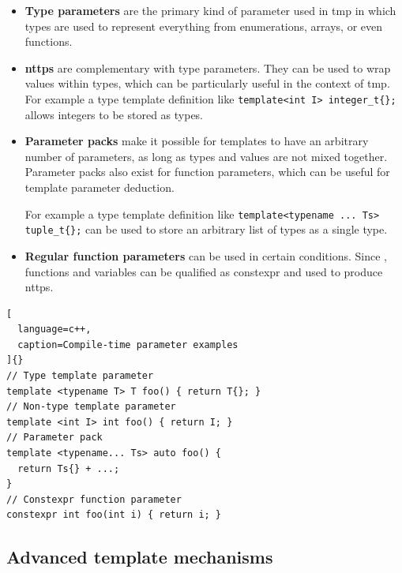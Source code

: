 \documentclass[../main]{subfiles}
\begin{document}
\begin{itemize}

  \item

\textbf{Type parameters} are the primary kind of parameter used in \gls{tmp}
in which types are used to represent everything from enumerations, arrays,
or even functions.

  \item

\textbf{\glspl{nttp}} are complementary with type parameters.
They can be used to wrap values within types, which can be particularly useful
in the context of \gls{tmp}. For example a type template definition like
\lstinline|template<int I> integer_t{};| allows integers to be stored as types.

  \item

\textbf{Parameter packs} make it possible for templates to have an
arbitrary number of parameters, as long as types and values
are not mixed together. Parameter packs also exist for function parameters,
which can be useful for template parameter deduction.

For example a type template definition like
\lstinline|template<typename ... Ts> tuple_t{};| can be used to store an
arbitrary list of types as a single type.

  \item

\textbf{Regular function parameters} can be used in certain conditions.
Since , functions and variables can be qualified as \gls{constexpr}
and used to produce \glspl{nttp}.

\end{itemize}

\begin{lstlisting}[
  language=c++,
  caption=Compile-time parameter examples
]{}
// Type template parameter
template <typename T> T foo() { return T{}; }
// Non-type template parameter
template <int I> int foo() { return I; }
// Parameter pack
template <typename... Ts> auto foo() {
  return Ts{} + ...;
}
// Constexpr function parameter
constexpr int foo(int i) { return i; }
\end{lstlisting}

\subsection{
  Advanced \cpp template mechanisms
}
\end{document}
